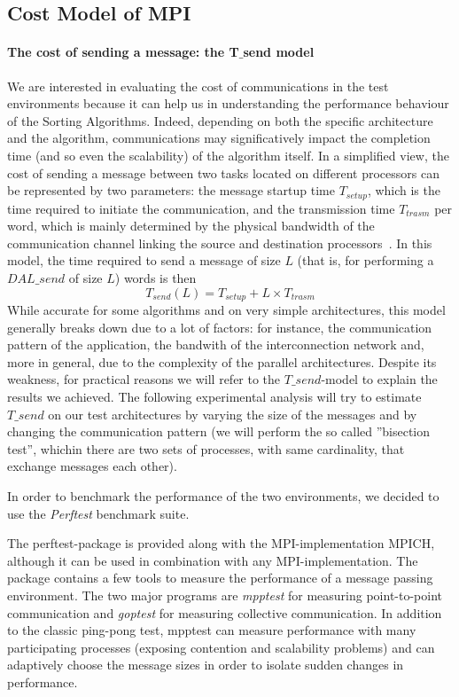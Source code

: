 \subsection{Cost Model of MPI}
\label{MPI-cost-model}
\paragraph{The cost of sending a message: the T$\_$send model}
We are interested in evaluating the cost of communications in the test environments because it can help us in understanding the performance behaviour of the Sorting Algorithms. Indeed, depending on both the specific architecture and the algorithm, communications may significatively impact the completion time (and so even the scalability) of the algorithm itself. In a simplified view, the cost of sending a message between two tasks located on different processors can be represented by two parameters: the message startup time $T_{setup}$, which is the time required to initiate the communication, and the transmission time $T_{trasm}$ per word, which is mainly determined by the physical bandwidth of the communication channel linking the source and destination processors~\cite{VANN}. In this model, the time required to send a message of size $L$ (that is, for performing a $DAL\_send$ of size $L$) words is then
\[
T_{send}(L) = T_{setup} + L \times T_{trasm}
\]
While accurate for some algorithms and on very simple architectures, this model generally breaks down due to a lot of factors: for instance, the communication pattern of the application, the bandwith of the interconnection network and, more in general, due to the complexity of the parallel architectures. Despite its weakness, for practical reasons we will refer to the $T\_send$-model to explain the results we achieved.  
The following experimental analysis will try to estimate $T\_send$ on our test architectures by varying the size of the messages and by changing the communication pattern (we will perform the so called ''bisection test'', whichin there are two sets of processes, with same cardinality, that exchange messages each other). 

In order to benchmark the performance of the two environments, we decided to use the \textit{Perftest} benchmark suite.

The perftest-package is provided along with the MPI-implementation MPICH, although it can be used in combination with any MPI-implementation. The package contains a few tools to measure the performance of a message passing environment. The two major programs are \textit{mpptest} for measuring point-to-point communication and \textit{goptest} for measuring collective communication. In addition to the classic ping-pong test, mpptest can measure performance with many participating processes (exposing contention and scalability problems) and can adaptively choose the message sizes in order to isolate sudden changes in performance. 

